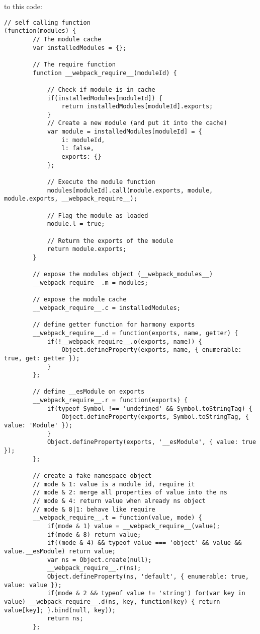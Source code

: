 to this code: 
\begin{lstlisting}
// self calling function
(function(modules) {
        // The module cache
        var installedModules = {};
    
        // The require function
        function __webpack_require__(moduleId) {
    
            // Check if module is in cache
            if(installedModules[moduleId]) {
                return installedModules[moduleId].exports;
            }
            // Create a new module (and put it into the cache)
            var module = installedModules[moduleId] = {
                i: moduleId,
                l: false,
                exports: {}
            };
    
            // Execute the module function
            modules[moduleId].call(module.exports, module, module.exports, __webpack_require__);
    
            // Flag the module as loaded
            module.l = true;
    
            // Return the exports of the module
            return module.exports;
        }
    
        // expose the modules object (__webpack_modules__)
        __webpack_require__.m = modules;
    
        // expose the module cache
        __webpack_require__.c = installedModules;
    
        // define getter function for harmony exports
        __webpack_require__.d = function(exports, name, getter) {
            if(!__webpack_require__.o(exports, name)) {
                Object.defineProperty(exports, name, { enumerable: true, get: getter });
            }
        };
    
        // define __esModule on exports
        __webpack_require__.r = function(exports) {
            if(typeof Symbol !== 'undefined' && Symbol.toStringTag) {
                Object.defineProperty(exports, Symbol.toStringTag, { value: 'Module' });
            }
            Object.defineProperty(exports, '__esModule', { value: true });
        };
    
        // create a fake namespace object
        // mode & 1: value is a module id, require it
        // mode & 2: merge all properties of value into the ns
        // mode & 4: return value when already ns object
        // mode & 8|1: behave like require
        __webpack_require__.t = function(value, mode) {
            if(mode & 1) value = __webpack_require__(value);
            if(mode & 8) return value;
            if((mode & 4) && typeof value === 'object' && value && value.__esModule) return value;
            var ns = Object.create(null);
            __webpack_require__.r(ns);
            Object.defineProperty(ns, 'default', { enumerable: true, value: value });
            if(mode & 2 && typeof value != 'string') for(var key in value) __webpack_require__.d(ns, key, function(key) { return value[key]; }.bind(null, key));
            return ns;
        };
    

\end{lstlisting}
